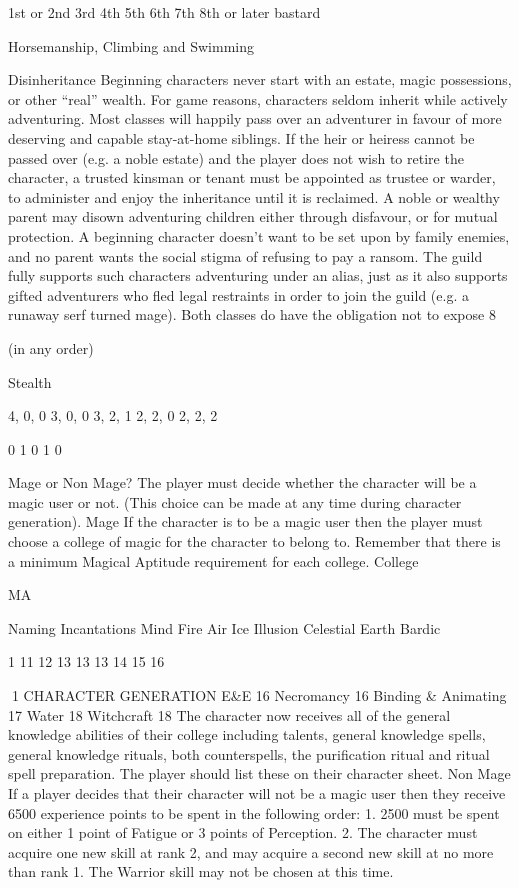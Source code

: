\documentclass[a4paper]{article}
\begin{document}
\begin{multicols}{3}
1st or 2nd
3rd
4th
5th
6th
7th
8th or later
bastard

Horsemanship,
Climbing and
Swimming

Disinheritance
Beginning characters never start with an estate,
magic possessions, or other “real” wealth. For
game reasons, characters seldom inherit while
actively adventuring. Most classes will happily
pass over an adventurer in favour of more deserving and capable stay-at-home siblings. If the heir or
heiress cannot be passed over (e.g. a noble estate)
and the player does not wish to retire the character,
a trusted kinsman or tenant must be appointed as
trustee or warder, to administer and enjoy the inheritance until it is reclaimed.
A noble or wealthy parent may disown adventuring
children either through disfavour, or for mutual
protection. A beginning character doesn’t want to
be set upon by family enemies, and no parent
wants the social stigma of refusing to pay a ransom. The guild fully supports such characters
adventuring under an alias, just as it also supports
gifted adventurers who fled legal restraints in order
to join the guild (e.g. a runaway serf turned mage).
Both classes do have the obligation not to expose
8

(in any order)

Stealth

4, 0, 0
3, 0, 0
3, 2, 1
2, 2, 0
2, 2, 2

0
1
0
1
0

Mage or Non Mage?
The player must decide whether the character will
be a magic user or not. (This choice can be made at
any time during character generation).
Mage
If the character is to be a magic user then the
player must choose a college of magic for the
character to belong to. Remember that there is a
minimum Magical Aptitude requirement for each
college.
College

MA

Naming Incantations
Mind
Fire
Air
Ice
Illusion
Celestial
Earth
Bardic

1
11
12
13
13
13
14
15
16

1 CHARACTER GENERATION
E\&E
16
Necromancy
16
Binding \& Animating 17
Water
18
Witchcraft
18
The character now receives all of the general
knowledge abilities of their college including talents, general knowledge spells, general knowledge
rituals, both counterspells, the purification ritual
and ritual spell preparation.
The player should list these on their character
sheet.
Non Mage
If a player decides that their character will not be a
magic user then they receive 6500 experience
points to be spent in the following order:
1. 2500 must be spent on either 1 point of Fatigue
or 3 points of Perception.
2. The character must acquire one new skill at rank
2, and may acquire a second new skill at no more
than rank 1. The Warrior skill may not be chosen at
this time.


\end{multicols}
\end{document}

